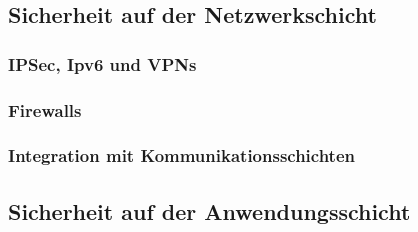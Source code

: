 \documentclass[utf8,biblatex]{lni}
\begin{document}
\subsection{Sicherheit auf der Netzwerkschicht}

\subsubsection{IPSec, Ipv6 und VPNs}

\subsubsection{Firewalls}

\subsubsection{Integration mit Kommunikationsschichten}

\subsection{Sicherheit auf der Anwendungsschicht}
\end{document}
